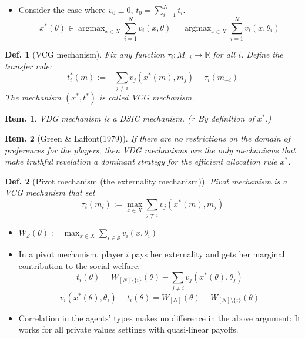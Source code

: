 \documentclass[11pt,a4paper,dvipdfmx]{article}
\theoremstyle{plain}
\newtheorem{df}{Def.}[section]
\newtheorem{rem}{Rem.}[section]
\newcommand{\R}{\mathbb{R}}
\newcommand{\mS}{\mathcal{S}}
\newcommand{\1}{\mathbbm{1}}
\DeclareMathOperator*{\argmax}{argmax}
\begin{document}
\begin{itemize}
	\item Consider the case where $v_0 \equiv 0$, $t_0 = \sum_{i=1}^N t_i$.
	\[
	x^*(\theta) \in \argmax_{x \in X}\sum_{i=1}^N v_i(x, \theta)
	= \argmax_{x \in X}\sum_{i=1}^N v_i(x, \theta_i)
	\]
\end{itemize}
\begin{df}[VCG mechanism]
	Fix any function $\tau_i: M_{-i} \to \R$ for all $i$. Define the transfer rule:
	\[
	t^*_i(m) := - \sum_{j \neq i} v_j(x^*(m), m_j) + \tau_i(m_{-i})
	\]
	The mechanism $(x^*, t^*)$ is called VCG mechanism.
\end{df}
\begin{rem}
	VDG mechanism is a DSIC mechanism. ($\because$ By definition of $x^*$.)
\end{rem}
\begin{rem}[Green \& Laffont(1979)]
	If there are no restrictions on the domain of preferences for the players, then VDG mechanisms are the only mechanisms that make truthful revelation a dominant strategy for the efficient allocation rule $x^*$.
\end{rem}

\begin{df}[Pivot mechanism (the externality mechanism)]
	Pivot mechanism is a VCG mechanism that set 
	\[
	\tau_i(m_i) := \max_{x \in X} \sum_{j \neq i} v_j(x^*(m), m_j)
	\]
\end{df}
\begin{itemize}
	\item $W_{\mS}(\theta) := \max_{x \in X} \sum_{i \in \mS}v_i(x, \theta_i)$
	\item In a pivot mechanism, player $i$ pays her externality and gets her marginal contribution to the social welfare:
	\[
	t_i(\theta) = W_{[N] \setminus \{i\}}(\theta) - \sum_{j \neq i} v_j(x^*(\theta), \theta_j)
	\]
	\[
	v_i(x^*(\theta), \theta_i) - t_i(\theta) = W_{[N]}(\theta) - W_{[N] \setminus \{i\}}(\theta)
	\]
	\item Correlation in the agents' types makes no difference in the above argument: It works for all private values settings with quasi-linear payoffs.
\end{itemize}
\end{document}
